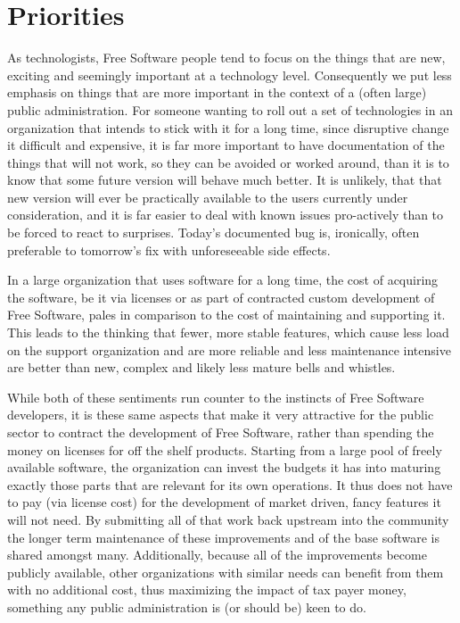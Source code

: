 \section*{Priorities}

As technologists, Free Software people tend to focus on the things that are
new, exciting and seemingly important at a technology level. Consequently we
put less emphasis on things that are more important in the context of a (often
large) public administration. For someone wanting to roll out a
set of technologies in an organization that intends to stick with it for a long
time, since disruptive change it difficult and expensive, it is far more
important to have documentation of the things that will not work, so they can
be avoided or worked around, than it is to know that some future version will
behave much better. It is unlikely, that that new version will ever be
practically available to the users currently under consideration, and it is far
easier to deal with known issues pro-actively than to be forced to react to
surprises.  Today's documented bug is, ironically, often preferable to
tomorrow's fix with unforeseeable side effects.

In a large organization that uses software for a long time, the cost of acquiring
the software, be it via licenses or as part of contracted custom development of
Free Software, pales in comparison to the cost of maintaining and supporting it.
This leads to the thinking that fewer, more stable features, which cause less load
on the support organization and are more reliable and less maintenance intensive
are better than new, complex and likely less mature bells and whistles.

While both of these sentiments run counter to the instincts of Free Software
developers, it is these same aspects that make it very attractive for the
public sector to contract the development of Free Software, rather than
spending the money on licenses for off the shelf products. Starting from a
large pool of freely available software, the organization can invest the
budgets it has into maturing exactly those parts that are relevant for its own
operations. It thus does not have to pay (via license cost) for the development of
market driven, fancy features it will not need. By submitting all of that work
back upstream into the community the longer term maintenance of these
improvements and of the base software is shared amongst many. Additionally,
because all of the improvements become publicly available, other
organizations with similar needs can benefit from them with no
additional cost, thus maximizing the impact of tax payer money,
something any public administration is (or should be) keen to do.

